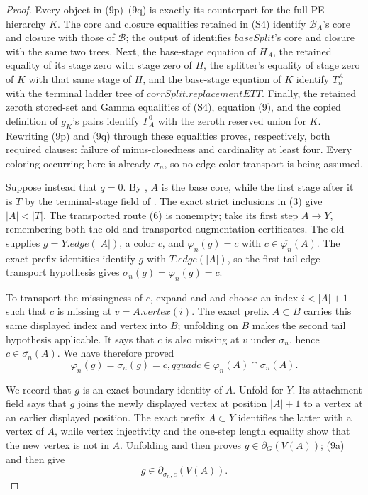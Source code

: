 \begin{proof}
Every object in (9p)--(9q) is exactly its counterpart for the full PE
hierarchy \(K\).  The core and closure equalities retained in (S4)
identify \(\mathcal B_A\)'s core and closure with those of
\(\mathcal B\); the output of  identifies
\(\mathit{baseSplit}\)'s core and closure with the same two trees.  Next,
the base-stage equation of \(H_A\), the retained equality of its stage
zero with stage zero of \(H\), the splitter's equality of stage zero of
\(K\) with that same stage of \(H\), and the base-stage equation of \(K\)
identify \(T_n^A\) with the terminal ladder tree of
\(\mathit{corrSplit}.\mathit{replacementETT}\).  Finally, the retained
zeroth stored-set and Gamma equalities of (S4), equation (9), and the
copied definition of \(g_K\)'s pairs identify \(\Gamma_A^0\) with the
zeroth reserved union for \(K\).  Rewriting (9p) and (9q) through these
equalities proves, respectively, both required clauses: failure of
minus-closedness and cardinality at least four.  Every coloring occurring
here is already \(\sigma_n\), so no edge-color transport is being assumed.

Suppose instead that \(q=0\).  By
, \(A\) is the base core, while the first
stage after it is \(T\) by the terminal-stage field of
.  The exact strict inclusions in (3) give
\(|A|<|T|\).  The transported route (6) is nonempty; take its first step
\(A\to Y\), remembering both
the old and transported augmentation certificates.  The old
 supplies
\(g=Y.\mathit{edge}(|A|)\), a color \(c\), and
\(\varphi_n(g)=c\) with \(c\in\overline{\varphi_n}(A)\).  The exact
prefix identities identify \(g\) with \(T.\mathit{edge}(|A|)\), so the
first tail-edge transport hypothesis gives \(\sigma_n(g)=\varphi_n(g)=c\).

To transport the missingness of \(c\), expand
 and  and choose
an index \(i<|A|+1\) such that \(c\) is missing at
\(v=A.\mathit{vertex}(i)\).  The exact prefix \(A\subset B\) carries this
same displayed index and vertex into \(B\); unfolding
 on \(B\) makes the second tail hypothesis
applicable.  It says that \(c\) is also missing at \(v\) under
\(\sigma_n\), hence \(c\in\overline{\sigma_n}(A)\).  We have therefore
proved
\[
 \varphi_n(g)=\sigma_n(g)=c,qquad
 c\in\overline{\varphi_n}(A)\cap\overline{\sigma_n}(A).       \tag{9a}
\]

We record that \(g\) is an exact boundary identity of \(A\).  Unfold
 for \(Y\).  Its attachment field says that \(g\)
joins the newly displayed vertex at position \(|A|+1\) to a vertex at an
earlier displayed position.  The exact prefix \(A\subset Y\) identifies
the latter with a vertex of \(A\), while vertex injectivity and the
one-step length equality show that the new vertex is not in \(A\).
Unfolding  and then
 proves \(g\in\partial_G(V(A))\); (9a) and
 then give
\[
             g\in\partial_{\sigma_n,c}(V(A)).                 \tag{9b}
\]


\end{proof}
